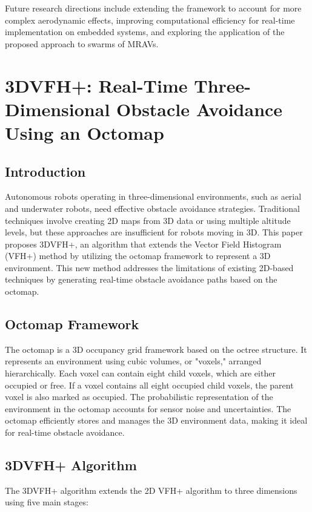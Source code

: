 \documentclass[a4paper,12pt]{article}
\begin{document}
    Future research directions include extending the framework to account for more complex aerodynamic effects, improving computational efficiency for real-time implementation on embedded systems, and exploring the application of the proposed approach to swarms of MRAVs.

\clearpage

\section{3DVFH+: Real-Time Three-Dimensional Obstacle Avoidance Using an Octomap}  
    \subsection{Introduction}
    Autonomous robots operating in three-dimensional environments, such as aerial and underwater robots, need effective obstacle avoidance strategies. Traditional techniques involve creating 2D maps from 3D data or using multiple altitude levels, but these approaches are insufficient for robots moving in 3D. This paper proposes 3DVFH+, an algorithm that extends the Vector Field Histogram (VFH+) method by utilizing the octomap framework to represent a 3D environment. This new method addresses the limitations of existing 2D-based techniques by generating real-time obstacle avoidance paths based on the octomap.
    
    \subsection{Octomap Framework}
    The octomap is a 3D occupancy grid framework based on the octree structure. It represents an environment using cubic volumes, or "voxels," arranged hierarchically. Each voxel can contain eight child voxels, which are either occupied or free. If a voxel contains all eight occupied child voxels, the parent voxel is also marked as occupied. The probabilistic representation of the environment in the octomap accounts for sensor noise and uncertainties. The octomap efficiently stores and manages the 3D environment data, making it ideal for real-time obstacle avoidance.
    
    \subsection{3DVFH+ Algorithm}
    The 3DVFH+ algorithm extends the 2D VFH+ algorithm to three dimensions using five main stages:
    
\end{document}
